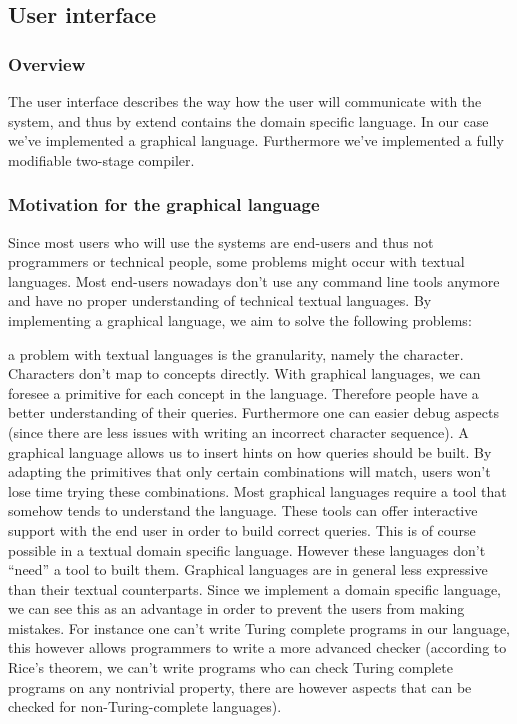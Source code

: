 
\subsection{User interface}
\subsubsection{Overview}
The user interface describes the way how the user will communicate with the
system, and thus by extend contains the domain specific language. In our case
we've implemented a graphical language. Furthermore we've implemented a fully
modifiable two-stage compiler.
\subsubsection{Motivation for the graphical language}
Since most users who will use the systems are end-users and thus not
programmers or technical people, some problems might occur with textual
languages. Most end-users nowadays don't use any command line tools anymore and
have no proper understanding of technical textual languages. By implementing a
graphical language, we aim to solve the following problems:
\begin{itemize}
  a problem with textual languages is
the granularity, namely the character. Characters don't map to concepts
directly. With graphical languages, we can foresee a primitive for each concept
in the language. Therefore people have a better understanding of their queries.
Furthermore one can easier debug aspects (since there are less issues with
writing an incorrect character sequence).
  A graphical language allows us to insert
hints on how queries should be built. By adapting the primitives that only
certain combinations will match, users won't lose time trying these
combinations.
Most graphical languages require a tool that somehow
tends to understand the language. These tools can offer interactive support
with the end user in order to build correct queries. This is of course possible
in a textual domain specific language. However these languages don't ``need''
a tool to built them.
Graphical languages are in general less
expressive than their textual counterparts. Since we implement a domain
specific language, we can see this as an advantage in order to prevent the
users from making mistakes. For instance one can't write Turing complete
programs in our language, this however allows programmers to write a more
advanced checker (according to Rice's theorem, we can't write programs who can
check Turing complete programs on any nontrivial property, there are however
aspects that can be checked for non-Turing-complete languages).
\end{itemize}
